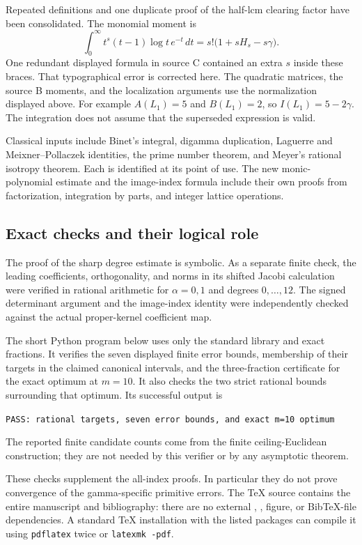 \documentclass[11pt,a4paper]{article}
\theoremstyle{definition}
\theoremstyle{remark}
\begin{document}
Repeated definitions and one duplicate proof of the half-lcm clearing
factor have been consolidated. The monomial moment is
\[
 \int_0^\infty t^s(t-1)\log t\,e^{-t}\,dt
 =s!\bigl(1+sH_s-s\gamma\bigr).
\]
One redundant displayed formula in source C contained an extra \(s\)
inside these braces. That typographical error is corrected here.
The quadratic matrices, the source B moments, and the localization
arguments use the normalization displayed above. For example
\(A(L_1)=5\) and \(B(L_1)=2\), so \(I(L_1)=5-2\gamma\).
The integration does not assume that the superseded expression is valid.

Classical inputs include Binet's integral, digamma duplication,
Laguerre and Meixner--Pollaczek identities, the prime number theorem,
and Meyer's rational isotropy theorem. Each is identified at its point
of use. The new monic-polynomial estimate and the image-index formula
include their own proofs from factorization, integration by parts,
and integer lattice operations.

\subsection{Exact checks and their logical role}

The proof of the sharp degree estimate is symbolic. As a separate
finite check, the leading coefficients, orthogonality, and norms in
its shifted Jacobi calculation were verified in rational arithmetic for
\(\alpha=0,1\) and degrees \(0,\ldots,12\). The signed determinant
argument and the image-index identity were independently checked
against the actual proper-kernel coefficient map.

The short Python program below uses only the standard library and
exact fractions. It verifies the seven displayed finite error bounds,
membership of their targets in the claimed canonical intervals, and
the three-fraction certificate for the exact optimum at \(m=10\).
It also checks the two strict rational bounds surrounding that optimum.
Its successful output is
\begin{center}
\small\texttt{PASS: rational targets, seven error bounds, and exact m=10 optimum}
\end{center}
The reported finite candidate counts come from the finite
ceiling-Euclidean construction; they are not needed by this verifier
or by any asymptotic theorem.

These checks supplement the all-index proofs. In particular they do
not prove convergence of the gamma-specific primitive errors.
The TeX source contains the entire manuscript and bibliography:
there are no external \texttt{\string}, \texttt{\string},
figure, or BibTeX-file dependencies. A standard TeX installation
with the listed packages can compile it using \texttt{pdflatex} twice
or \texttt{latexmk -pdf}.
\end{document}
